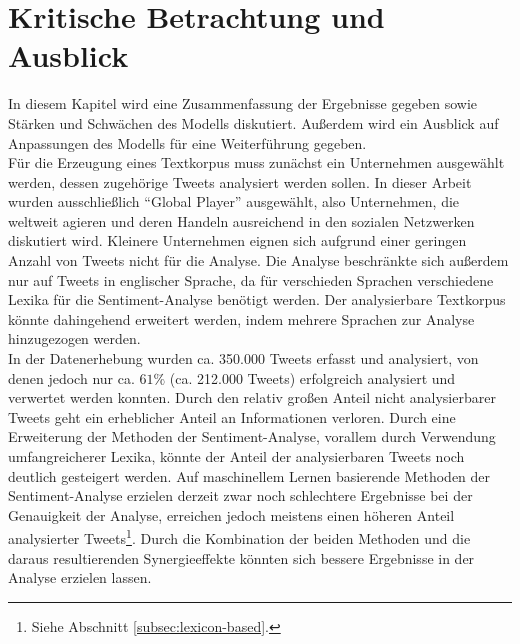 \documentclass[
	a4paper,
	12pt,
	bibliography=totocnumbered,
	twoside,
]{scrreprt}
\begin{document}
\chapter{Kritische Betrachtung und Ausblick}
In diesem Kapitel wird eine Zusammenfassung der Ergebnisse gegeben sowie Stärken und Schwächen des Modells diskutiert. Außerdem wird ein Ausblick auf Anpassungen des Modells für eine Weiterführung gegeben.\\

Für die Erzeugung eines Textkorpus muss zunächst ein Unternehmen ausgewählt werden, dessen zugehörige Tweets analysiert werden sollen. In dieser Arbeit wurden ausschließlich "`Global Player"' ausgewählt, also Unternehmen, die weltweit agieren und deren Handeln ausreichend in den sozialen Netzwerken diskutiert wird.
Kleinere Unternehmen eignen sich aufgrund einer geringen Anzahl von Tweets nicht für die Analyse.
Die Analyse beschränkte sich außerdem nur auf Tweets in englischer Sprache, da für verschieden Sprachen verschiedene Lexika für die Sentiment-Analyse benötigt werden. Der analysierbare Textkorpus könnte dahingehend erweitert werden, indem mehrere Sprachen zur Analyse hinzugezogen werden.\\

In der Datenerhebung wurden ca. 350.000 Tweets erfasst und analysiert, von denen jedoch nur ca. $61\%$ (ca. 212.000 Tweets) erfolgreich analysiert und verwertet werden konnten. Durch den relativ großen Anteil nicht analysierbarer Tweets geht ein erheblicher Anteil an Informationen verloren. Durch eine Erweiterung der Methoden der Sentiment-Analyse, vorallem durch Verwendung umfangreicherer Lexika, könnte der Anteil der analysierbaren Tweets noch deutlich gesteigert werden. Auf maschinellem Lernen basierende Methoden der Sentiment-Analyse erzielen derzeit zwar noch schlechtere Ergebnisse bei der Genauigkeit der Analyse, erreichen jedoch meistens einen höheren Anteil analysierter Tweets\footnote{Siehe Abschnitt \ref{subsec:lexicon-based}.}. Durch die Kombination der beiden Methoden und die daraus resultierenden Synergieeffekte könnten sich bessere Ergebnisse in der Analyse erzielen lassen.\\
\end{document}
